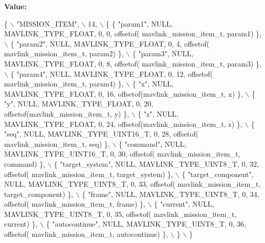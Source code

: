 {\bfseries Value\+:}
\begin{DoxyCode}
\{ \(\backslash\)
    \textcolor{stringliteral}{"MISSION\_ITEM"}, \(\backslash\)
    14, \(\backslash\)
    \{  \{ \textcolor{stringliteral}{"param1"}, NULL, MAVLINK_TYPE_FLOAT, 0, 0, offsetof(
      mavlink_mission_item_t, param1) \}, \(\backslash\)
         \{ \textcolor{stringliteral}{"param2"}, NULL, MAVLINK_TYPE_FLOAT, 0, 4, offsetof(
      mavlink_mission_item_t, param2) \}, \(\backslash\)
         \{ \textcolor{stringliteral}{"param3"}, NULL, MAVLINK_TYPE_FLOAT, 0, 8, offsetof(
      mavlink_mission_item_t, param3) \}, \(\backslash\)
         \{ \textcolor{stringliteral}{"param4"}, NULL, MAVLINK_TYPE_FLOAT, 0, 12, offsetof(
      mavlink_mission_item_t, param4) \}, \(\backslash\)
         \{ \textcolor{stringliteral}{"x"}, NULL, MAVLINK_TYPE_FLOAT, 0, 16, offsetof(mavlink_mission_item_t, x) \}, \(\backslash\)
         \{ \textcolor{stringliteral}{"y"}, NULL, MAVLINK_TYPE_FLOAT, 0, 20, offsetof(mavlink_mission_item_t, y) \}, \(\backslash\)
         \{ \textcolor{stringliteral}{"z"}, NULL, MAVLINK_TYPE_FLOAT, 0, 24, offsetof(mavlink_mission_item_t, z) \}, \(\backslash\)
         \{ \textcolor{stringliteral}{"seq"}, NULL, MAVLINK_TYPE_UINT16_T, 0, 28, offsetof(
      mavlink_mission_item_t, seq) \}, \(\backslash\)
         \{ \textcolor{stringliteral}{"command"}, NULL, MAVLINK_TYPE_UINT16_T, 0, 30, offsetof(
      mavlink_mission_item_t, command) \}, \(\backslash\)
         \{ \textcolor{stringliteral}{"target\_system"}, NULL, MAVLINK_TYPE_UINT8_T, 0, 32, offsetof(
      mavlink_mission_item_t, target\_system) \}, \(\backslash\)
         \{ \textcolor{stringliteral}{"target\_component"}, NULL, MAVLINK_TYPE_UINT8_T, 0, 33, offsetof(
      mavlink_mission_item_t, target\_component) \}, \(\backslash\)
         \{ \textcolor{stringliteral}{"frame"}, NULL, MAVLINK_TYPE_UINT8_T, 0, 34, offsetof(
      mavlink_mission_item_t, frame) \}, \(\backslash\)
         \{ \textcolor{stringliteral}{"current"}, NULL, MAVLINK_TYPE_UINT8_T, 0, 35, offsetof(
      mavlink_mission_item_t, current) \}, \(\backslash\)
         \{ \textcolor{stringliteral}{"autocontinue"}, NULL, MAVLINK_TYPE_UINT8_T, 0, 36, offsetof(
      mavlink_mission_item_t, autocontinue) \}, \(\backslash\)
         \} \(\backslash\)
\}
\end{DoxyCode}
\mbox{\label{mavlink__msg__mission__item_8h_a699af06c9e8d5ce922f7396a403a78a2}} 
